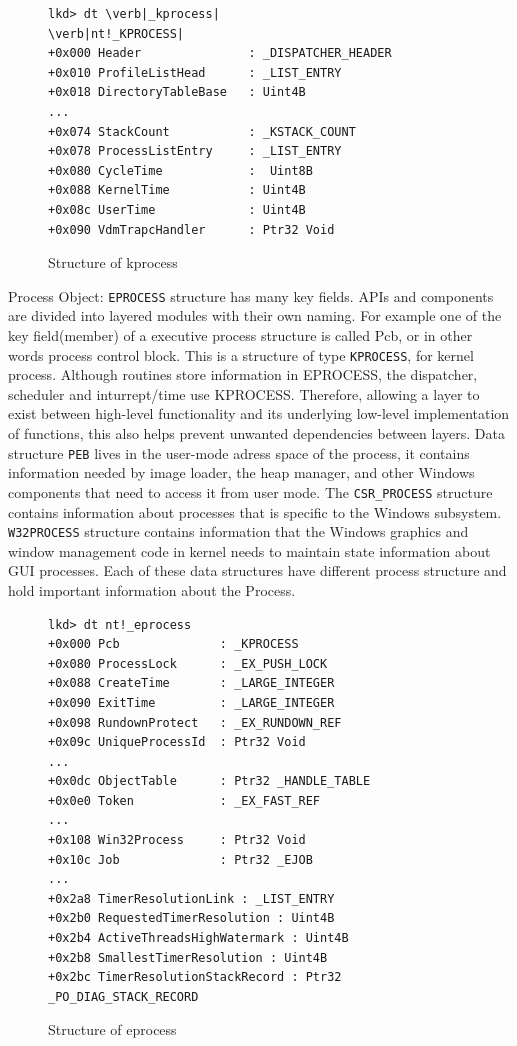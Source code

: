 \documentclass[letterpaper,10pt,draftclsnofoot,onecolumn]{IEEEtran}
\begin{document}
\begin{figure}[H]
\caption{Structure of kprocess}
\begin{lstlisting}
lkd> dt \verb|_kprocess|
\verb|nt!_KPROCESS|
+0x000 Header				: _DISPATCHER_HEADER
+0x010 ProfileListHead 		: _LIST_ENTRY
+0x018 DirectoryTableBase	: Uint4B
...
+0x074 StackCount			: _KSTACK_COUNT
+0x078 ProcessListEntry 	: _LIST_ENTRY
+0x080 CycleTime			:  Uint8B
+0x088 KernelTime			: Uint4B
+0x08c UserTime				: Uint4B
+0x090 VdmTrapcHandler		: Ptr32 Void
\end{lstlisting}
\end{figure}
Process Object: \verb|EPROCESS| structure has many key fields. APIs and components are divided into layered modules with their own naming. For example one of the key field(member) of a executive process structure is called Pcb, or in other words process control block. This is a structure of type \verb|KPROCESS|, for kernel process. Although routines store information in EPROCESS, the dispatcher, scheduler and inturrept/time use KPROCESS. Therefore, allowing a layer to exist between high-level functionality and its underlying low-level implementation of functions, this also helps prevent unwanted dependencies between layers. Data structure \verb|PEB| lives in the user-mode adress space of the process, it contains information needed by image loader, the heap manager, and other Windows components that need to access it from user mode. The \verb|CSR_PROCESS| structure contains information about processes that is specific to the Windows subsystem. \verb|W32PROCESS| structure contains information that the Windows graphics and window management code in kernel needs to maintain state information about GUI processes. Each of these data structures have different process structure and hold important information about the Process.
\begin{figure}[H]
\caption{Structure of eprocess}
\begin{lstlisting}
lkd> dt nt!_eprocess
+0x000 Pcb				: _KPROCESS
+0x080 ProcessLock		: _EX_PUSH_LOCK
+0x088 CreateTime		: _LARGE_INTEGER
+0x090 ExitTime			: _LARGE_INTEGER
+0x098 RundownProtect	: _EX_RUNDOWN_REF
+0x09c UniqueProcessId 	: Ptr32 Void
...
+0x0dc ObjectTable		: Ptr32 _HANDLE_TABLE
+0x0e0 Token			: _EX_FAST_REF
...
+0x108 Win32Process		: Ptr32 Void
+0x10c Job				: Ptr32 _EJOB
...
+0x2a8 TimerResolutionLink : _LIST_ENTRY
+0x2b0 RequestedTimerResolution : Uint4B	
+0x2b4 ActiveThreadsHighWatermark : Uint4B
+0x2b8 SmallestTimerResolution : Uint4B
+0x2bc TimerResolutionStackRecord : Ptr32 _PO_DIAG_STACK_RECORD
\end{lstlisting}
\end{figure}
\end{document}
